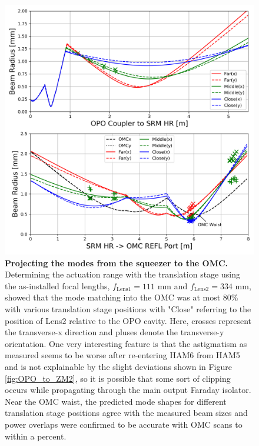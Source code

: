 	\begin{figure}[t!]
	\centering
	\includegraphics[width=0.8 \textwidth]{../Figures/OPO_to_OMCREFL_Oldlenses.png}
	\caption[Projecting the modes from the squeezer to the OMC.]  
	{\textbf{Projecting the modes from the squeezer to the OMC.}
		Determining the actuation range with the translation stage using the as-installed focal lengths, $f_{\text{Lens1}} = 111$ mm and $f_{\text{Lens2}} = 334$ mm, showed that the mode matching into the OMC was at most 80\% with various translation stage positions with "Close" referring to the position of Lens2 relative to the OPO cavity.  Here, crosses represent the transverse-x direction and pluses denote the transverse-y orientation.  One very interesting feature is that the astigmatism as measured seems to be worse after re-entering HAM6 from HAM5 and is not explainable by the slight deviations shown in Figure \ref{fig:OPO_to_ZM2}, so it is possible that some sort of clipping occurs while propagating through the main output Faraday isolator.  Near the OMC waist, the predicted mode shapes for different translation stage positions agree with the measured beam sizes and power overlaps were confirmed to be accurate with OMC scans to within a percent.
	}
	\label{fig:OPO_to_OMC_Old}
	\end{figure}

